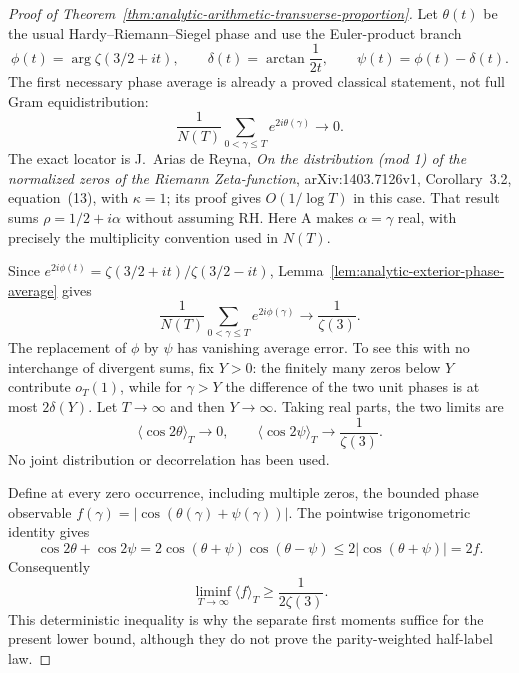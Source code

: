 \begin{proof}[Proof of Theorem~\ref{thm:analytic-arithmetic-transverse-proportion}]
Let $\theta(t)$ be the usual Hardy--Riemann--Siegel phase and
use the Euler-product branch
\[
 \phi(t)=\arg\zeta(3/2+it),\qquad
 \delta(t)=\arctan\frac1{2t},\qquad
 \psi(t)=\phi(t)-\delta(t).
\]
The first necessary phase average is already a proved
classical statement, not full Gram equidistribution:
\begin{equation}\label{eq:analytic-theta-first-mode}
 \frac1{N(T)}\sum_{0<\gamma\le T}e^{2i\theta(\gamma)}
                                      \longrightarrow0.
\end{equation}
The exact locator is J.~Arias de Reyna,
\emph{On the distribution (mod 1) of the normalized zeros of
the Riemann Zeta-function}, arXiv:1403.7126v1,
Corollary~3.2, equation~(13), with $\kappa=1$; its proof gives
$O(1/\log T)$ in this case. That result sums
$\rho=1/2+i\alpha$ without assuming RH. Here A makes
$\alpha=\gamma$ real, with precisely the multiplicity
convention used in $N(T)$.

Since $e^{2i\phi(t)}=\zeta(3/2+it)/\zeta(3/2-it)$,
Lemma~\ref{lem:analytic-exterior-phase-average} gives
\[
 \frac1{N(T)}\sum_{0<\gamma\le T}e^{2i\phi(\gamma)}
                                  \longrightarrow\frac1{\zeta(3)}.
\]
The replacement of $\phi$ by $\psi$ has vanishing average
error. To see this with no interchange of divergent sums,
fix $Y>0$: the finitely many zeros below $Y$ contribute
$o_T(1)$, while for $\gamma>Y$ the difference of the two
unit phases is at most $2\delta(Y)$. Let $T\to\infty$ and
then $Y\to\infty$. Taking real parts, the two limits are
\begin{equation}\label{eq:analytic-two-separate-real-means}
 \langle\cos2\theta\rangle_T\longrightarrow0,
 \qquad
 \langle\cos2\psi\rangle_T\longrightarrow\frac1{\zeta(3)}.
\end{equation}
No joint distribution or decorrelation has been used.

Define at every zero occurrence, including multiple zeros,
the bounded phase observable
$f(\gamma)=|\cos(\theta(\gamma)+\psi(\gamma))|$.
The pointwise trigonometric identity gives
\[
 \cos2\theta+\cos2\psi
   =2\cos(\theta+\psi)\cos(\theta-\psi)
   \le2|\cos(\theta+\psi)|=2f.
\]
Consequently
\begin{equation}\label{eq:analytic-all-phase-lower}
 \liminf_{T\to\infty}\langle f\rangle_T
                              \ge\frac1{2\zeta(3)}.
\end{equation}
This deterministic inequality is why the separate first
moments suffice for the present lower bound, although they
do not prove the parity-weighted half-label law.


\end{proof}
